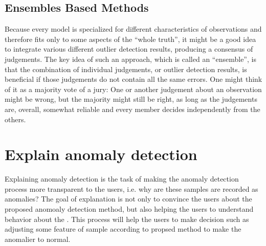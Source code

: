 \subsection{Ensembles Based Methods}

Because every model is specialized for different 
characteristics of observations and therefore fits 
only to some aspects of the “whole truth”,
it might be a good idea to integrate various different
outlier detection results,
producing a consensus of judgements.
The key idea of such an approach,
which is called an “ensemble”,
is that the combination of individual judgements,
or outlier detection results,
is beneficial if those judgements do not contain all the same errors.
One might think of it as a majority vote of a 
jury: 
One or another judgement about an observation might be wrong,
but the majority might still be right,
as long as the judgements are,
overall,
somewhat reliable and every member decides independently from the
others.

\section{Explain anomaly detection}
\label{sec-explain_anomaly}
Explaining anomaly detection is the task of making
the anomaly detection process more transparent to the users,
i.e. why are these samples are recorded as anomalies?
The  goal of explanation is not only to
convince the users about the proposed anomoaly detection method,
but also helping the users to understand behavior about
the .
This process will help the users to make decision such as
adjusting some feature of sample according to propsed method to
make the anomalier to normal.

